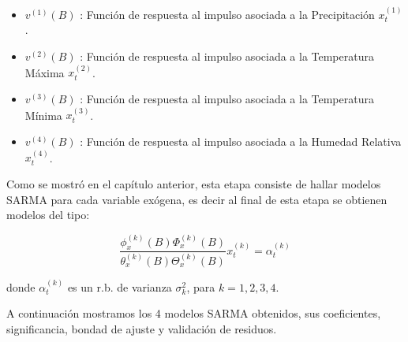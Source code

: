 \documentclass[12pt,oneside]{book}\usepackage[]{graphicx}\usepackage[]{color}
\theoremstyle{definition} %
\begin{document}
\begin{itemize}
\item $v^{(1)}(B)$ : Función de respuesta al impulso asociada a la Precipitación $x^{(1)}_t$.
\item $v^{(2)}(B)$ : Función de respuesta al impulso asociada a la Temperatura Máxima $x^{(2)}_t$.
\item $v^{(3)}(B)$ : Función de respuesta al impulso asociada a la Temperatura Mínima $x^{(3)}_t$.
\item $v^{(4)}(B)$ : Función de respuesta al impulso asociada a la Humedad Relativa $x^{(4)}_t$.
\end{itemize}


Como se mostró en el capítulo anterior, esta etapa consiste de hallar modelos SARMA para cada variable exógena, es decir al final de esta etapa se obtienen modelos del tipo:


$$\frac{ \phi_x^{(k)}(B) \Phi_x^{(k)}(B) }{\theta_x^{(k)}(B) \Theta_x^{(k)}(B)} x^{(k)}_t= \alpha^{(k)}_t $$

donde $\alpha^{(k)}_t$ es un r.b. de varianza $\sigma^2_k$, para $k=1,2,3,4$.

A continuación mostramos los 4 modelos SARMA obtenidos, sus coeficientes, significancia, bondad de ajuste y validación de residuos.
\end{document}
